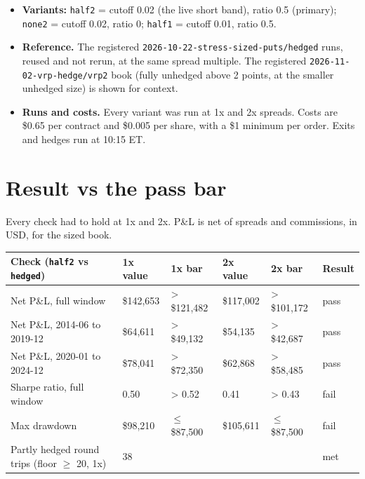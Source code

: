 \documentclass{article}
\begin{document}
\begin{itemize}
\item \textbf{Variants:} \texttt{half2} = cutoff 0.02 (the live short band), ratio 0.5 (primary); \texttt{none2} = cutoff 0.02, ratio 0; \texttt{half1} = cutoff 0.01, ratio 0.5.

\item \textbf{Reference.} The registered \texttt{2026-\allowbreak{}10-\allowbreak{}22-\allowbreak{}stress-\allowbreak{}sized-\allowbreak{}puts/\allowbreak{}hedged} runs, reused and not rerun, at the same spread multiple. The registered \texttt{2026-\allowbreak{}11-\allowbreak{}02-\allowbreak{}vrp-\allowbreak{}hedge/\allowbreak{}vrp2} book (fully unhedged above 2 points, at the smaller unhedged size) is shown for context.

\item \textbf{Runs and costs.} Every variant was run at 1x and 2x spreads. Costs are \$0.65 per contract and \$0.005 per share, with a \$1 minimum per order. Exits and hedges run at 10:15 ET.

\end{itemize}

\section{Result vs the pass bar}

Every check had to hold at 1x and 2x. P\&L is net of spreads and commissions, in USD, for the sized book.

\begin{center}\small
\begin{tabularx}{\linewidth}{>{\raggedright\arraybackslash}X l l l l l}
\toprule
\textbf{Check (\texttt{half2} vs \texttt{hedged})} & \textbf{1x value} & \textbf{1x bar} & \textbf{2x value} & \textbf{2x bar} & \textbf{Result} \\
\midrule
Net P\&L, full window & \$142,653 & > \$121,482 & \$117,002 & > \$101,172 & pass \\
Net P\&L, 2014-06 to 2019-12 & \$64,611 & > \$49,132 & \$54,135 & > \$42,687 & pass \\
Net P\&L, 2020-01 to 2024-12 & \$78,041 & > \$72,350 & \$62,868 & > \$58,485 & pass \\
Sharpe ratio, full window & 0.50 & > 0.52 & 0.41 & > 0.43 & fail \\
Max drawdown & \$98,210 & \ensuremath{\leq} \$87,500 & \$105,611 & \ensuremath{\leq} \$87,500 & fail \\
Partly hedged round trips (floor \ensuremath{\geq} 20, 1x) & 38 &  &  &  & met \\
\bottomrule
\end{tabularx}
\end{center}
\end{document}
